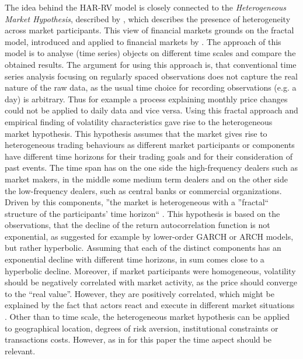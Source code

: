 The idea behind the HAR-RV model is closely connected to the \emph{Heterogeneous Market Hypothesis}, described by \textcite{mueller1993}, which describes the presence of heterogeneity across market participants. This view of financial markets grounds on the fractal model, introduced and applied to financial markets by \textcite{mandelbrot1963}. The approach of this model is to analyse (time series) objects on different time scales and compare the obtained results. The argument for using this approach is, that conventional time series analysis focusing on regularly spaced observations does not capture the real nature of the raw data, as the usual time choice for recording observations (e.g. a day) is arbitrary. Thus for example a process explaining monthly price changes could not be applied to daily data and vice versa. Using this fractal approach and empirical finding of volatility characteristics gave rise to the heterogeneous market hypothesis. This hypothesis assumes that the market gives rise to heterogeneous trading behaviours as different market participants or components have different time horizons for their trading goals and for their consideration of past events. The time span has on the one side the high-frequency dealers such as market makers, in the middle some medium term dealers and on the other side the low-frequency dealers, such as central banks or commercial organizations. Driven by this components, ''the market is heterogeneous with a ''fractal`` structure of the participants' time horizon`` \parencite[p.12]{mueller1993}. This hypothesis is based on the observations, that the decline of the return autocorrelation function is not exponential, as suggested for example by lower-order GARCH or ARCH models, but rather hyperbolic. Assuming that each of the distinct components has an exponential decline with different time horizons, in sum comes close to a hyperbolic decline. Moreover, if market participants were homogeneous, volatility should be negatively correlated with market activity, as the price should converge to the ``real value''. However, they are positively correlated, which might be explained by the fact that actors react and execute in different market situations \parencite{mueller1993}. Other than to time scale, the heterogeneous market hypothesis can be applied to geographical location, degrees of risk aversion, institutional constraints or transactions costs. However, as in \textcite{corsi2009} for this paper the time aspect should be relevant.\\
